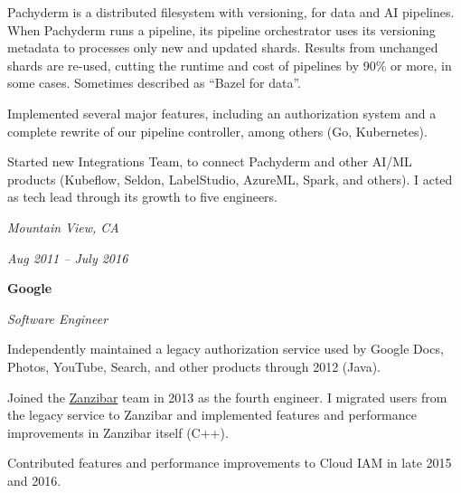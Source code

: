 \documentclass[10pt, letterpaper]{article}
\begin{document}
\vspace{0.1 cm}

\begin{onecolentry}
    \begin{highlights}
        \item Pachyderm is a distributed filesystem with versioning, for data and AI pipelines. When Pachyderm runs a pipeline, its pipeline orchestrator uses its versioning metadata to processes only new and updated shards. Results from unchanged shards are re-used, cutting the runtime and cost of pipelines by 90\% or more, in some cases. Sometimes described as ``Bazel for data''.
        \item Implemented several major features, including an authorization system and a complete rewrite of our pipeline controller, among others (Go, Kubernetes).
        \item Started new Integrations Team, to connect Pachyderm and other AI/ML products (Kubeflow, Seldon, LabelStudio, AzureML, Spark, and others). I acted as tech lead through its growth to five engineers.
    \end{highlights}
  \end{onecolentry}

\vspace{0.2 cm}

\begin{twocolentry}{
    \textit{Mountain View, CA}

    \textit{Aug 2011 – July 2016}
}
    \textbf{Google}

    \textit{Software Engineer}
\end{twocolentry}

\vspace{0.1 cm}
\begin{onecolentry}
    \begin{highlights}
        \item Independently maintained a legacy authorization service used by Google Docs, Photos, YouTube, Search, and other products through 2012 (Java).
        \item Joined the \href{https://research.google/pubs/zanzibar-googles-consistent-global-authorization-system/}{Zanzibar} team in 2013 as the fourth engineer. I migrated users from the legacy service to Zanzibar and implemented features and performance improvements in Zanzibar itself (C++).
        \item Contributed features and performance improvements to Cloud IAM in late 2015 and 2016.
    \end{highlights}
\end{onecolentry}
\end{document}
